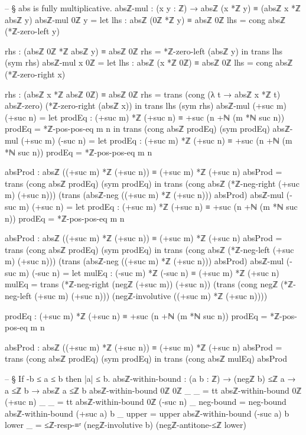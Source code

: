\documentclass[11pt,a4paper]{book}
\begin{document}
\begin{code}
-- § abs is fully multiplicative.
absℤ-mul : (x y : ℤ) → absℤ (x *ℤ y) ≡ (absℤ x *ℤ absℤ y)
absℤ-mul 0ℤ y =
  let
    lhs : absℤ (0ℤ *ℤ y) ≡ absℤ 0ℤ
    lhs = cong absℤ (*ℤ-zero-left y)

    rhs : (absℤ 0ℤ *ℤ absℤ y) ≡ absℤ 0ℤ
    rhs = *ℤ-zero-left (absℤ y)
  in
  trans lhs (sym rhs)
absℤ-mul x 0ℤ =
  let
    lhs : absℤ (x *ℤ 0ℤ) ≡ absℤ 0ℤ
    lhs = cong absℤ (*ℤ-zero-right x)

    rhs : (absℤ x *ℤ absℤ 0ℤ) ≡ absℤ 0ℤ
    rhs =
      trans
        (cong (λ t → absℤ x *ℤ t) absℤ-zero)
        (*ℤ-zero-right (absℤ x))
  in
  trans lhs (sym rhs)
absℤ-mul (+suc m) (+suc n) =
  let
    prodEq : (+suc m) *ℤ (+suc n) ≡ +suc (n +ℕ (m *ℕ suc n))
    prodEq = *ℤ-pos-pos-eq m n
  in
  trans (cong absℤ prodEq) (sym prodEq)
absℤ-mul (+suc m) (-suc n) =
  let
    prodEq : (+suc m) *ℤ (+suc n) ≡ +suc (n +ℕ (m *ℕ suc n))
    prodEq = *ℤ-pos-pos-eq m n

    absProd : absℤ ((+suc m) *ℤ (+suc n)) ≡ (+suc m) *ℤ (+suc n)
    absProd = trans (cong absℤ prodEq) (sym prodEq)
  in
  trans
    (cong absℤ (*ℤ-neg-right (+suc m) (+suc n)))
    (trans (absℤ-neg ((+suc m) *ℤ (+suc n))) absProd)
absℤ-mul (-suc m) (+suc n) =
  let
    prodEq : (+suc m) *ℤ (+suc n) ≡ +suc (n +ℕ (m *ℕ suc n))
    prodEq = *ℤ-pos-pos-eq m n

    absProd : absℤ ((+suc m) *ℤ (+suc n)) ≡ (+suc m) *ℤ (+suc n)
    absProd = trans (cong absℤ prodEq) (sym prodEq)
  in
  trans
    (cong absℤ (*ℤ-neg-left (+suc m) (+suc n)))
    (trans (absℤ-neg ((+suc m) *ℤ (+suc n))) absProd)
absℤ-mul (-suc m) (-suc n) =
  let
    mulEq : (-suc m) *ℤ (-suc n) ≡ (+suc m) *ℤ (+suc n)
    mulEq =
      trans
        (*ℤ-neg-right (negℤ (+suc m)) (+suc n))
        (trans
          (cong negℤ (*ℤ-neg-left (+suc m) (+suc n)))
          (negℤ-involutive ((+suc m) *ℤ (+suc n))))

    prodEq : (+suc m) *ℤ (+suc n) ≡ +suc (n +ℕ (m *ℕ suc n))
    prodEq = *ℤ-pos-pos-eq m n

    absProd : absℤ ((+suc m) *ℤ (+suc n)) ≡ (+suc m) *ℤ (+suc n)
    absProd = trans (cong absℤ prodEq) (sym prodEq)
  in
  trans (cong absℤ mulEq) absProd

-- § If -b ≤ a ≤ b then |a| ≤ b.
absℤ-within-bound : (a b : ℤ) → (negℤ b) ≤ℤ a → a ≤ℤ b → absℤ a ≤ℤ b
absℤ-within-bound 0ℤ 0ℤ _ _ = tt
absℤ-within-bound 0ℤ (+suc n) _ _ = tt
absℤ-within-bound 0ℤ (-suc n) _ neg-bound = neg-bound
absℤ-within-bound (+suc a) b _ upper = upper
absℤ-within-bound (-suc a) b lower _ =
  ≤ℤ-resp-≡ʳ (negℤ-involutive b) (negℤ-antitone-≤ℤ lower)
\end{code}
\end{document}
